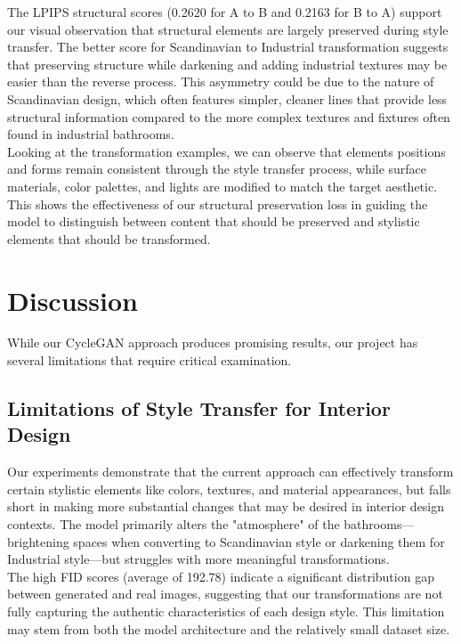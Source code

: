 \documentclass[twocolumn,superscriptaddress,aps]{revtex4-1}
\begin{document}
The LPIPS structural scores (0.2620 for A to B and 0.2163 for B to A) support our visual observation that structural elements are largely preserved during style transfer. The better score for Scandinavian to Industrial transformation suggests that preserving structure while darkening and adding industrial textures may be easier than the reverse process. This asymmetry could be due to the nature of Scandinavian design, which often features simpler, cleaner lines that provide less structural information compared to the more complex textures and fixtures often found in industrial bathrooms. \\

Looking at the transformation examples, we can observe that elements positions and forms remain consistent through the style transfer process, while surface materials, color palettes, and lights are modified to match the target aesthetic. This shows the effectiveness of our structural preservation loss in guiding the model to distinguish between content that should be preserved and stylistic elements that should be transformed.

\section{Discussion}

While our CycleGAN approach produces promising results, our project has several limitations that require critical examination.

\subsection{Limitations of Style Transfer for Interior Design}

Our experiments demonstrate that the current approach can effectively transform certain stylistic elements like colors, textures, and material appearances, but falls short in making more substantial changes that may be desired in interior design contexts. The model primarily alters the "atmosphere" of the bathrooms—brightening spaces when converting to Scandinavian style or darkening them for Industrial style—but struggles with more meaningful transformations. \\

The high FID scores (average of 192.78) indicate a significant distribution gap between generated and real images, suggesting that our transformations are not fully capturing the authentic characteristics of each design style. This limitation may stem from both the model architecture and the relatively small dataset size.
\end{document}
